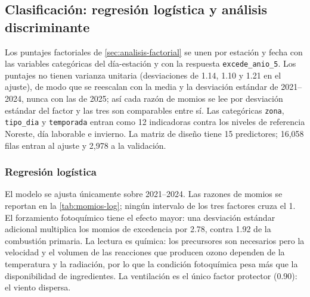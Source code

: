 \subsection{Clasificación: regresión logística y análisis discriminante}
\label{sec:clasificacion_tecs}

Los puntajes factoriales de \cref{sec:analisis-factorial} se unen por
estación y fecha con las variables categóricas del día-estación y con la
respuesta \texttt{excede\_anio\_5}. Los puntajes no tienen varianza unitaria
(desviaciones de 1.14, 1.10 y 1.21 en el ajuste), de modo que se reescalan
con la media y la desviación estándar de 2021--2024, nunca con las de 2025;
así cada razón de momios se lee por desviación estándar del factor y las
tres son comparables entre sí. Las categóricas \texttt{zona},
\texttt{tipo\_dia} y \texttt{temporada} entran como 12 indicadoras contra
los niveles de referencia Noreste, día laborable e invierno. La matriz de
diseño tiene 15 predictores; 16,058 filas entran al ajuste y 2,978 a la
validación.

\subsubsection{Regresión logística}\label{sec:reg_log}

El modelo se ajusta únicamente sobre 2021--2024. Las razones de momios se
reportan en la \cref{tab:momios-log}; ningún intervalo de los tres factores
cruza el 1. El forzamiento fotoquímico tiene el efecto mayor: una desviación
estándar adicional multiplica los momios de excedencia por 2.78, contra 1.92
de la combustión primaria. La lectura es química: los precursores son
necesarios pero la velocidad y el volumen de las reacciones que producen
ozono dependen de la temperatura y la radiación, por lo que la condición
fotoquímica pesa más que la disponibilidad de ingredientes. La ventilación
es el único factor protector (0.90): el viento dispersa.


